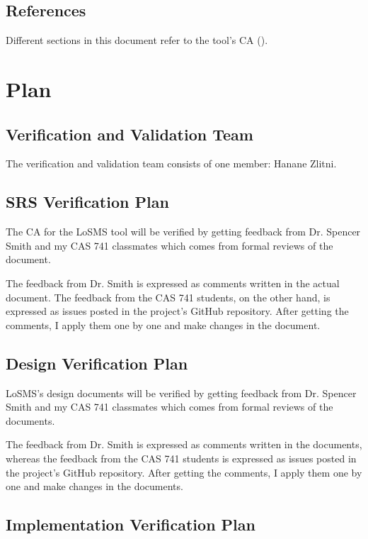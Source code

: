 \documentclass[12pt, titlepage]{article}
\newcommand{\famname}{LoSMS} %
\begin{document}
\subsection{References}

Different sections in this document refer to the tool's CA (\cite{losms-ca}).

\section{Plan} \label{Plan}
	
\subsection{Verification and Validation Team}

The verification and validation team consists of one member: Hanane Zlitni.

\subsection{SRS Verification Plan}

The CA for the \famname{} tool will be verified by getting feedback from Dr. 
Spencer Smith and my CAS 741 classmates which comes from formal reviews of the 
document. 

The feedback from Dr. Smith is expressed as comments written in the actual 
document. The feedback from the CAS 741 students, on the other hand, is 
expressed as issues posted in the project's GitHub repository. After getting 
the comments, I apply them one by one and make changes in the document.

\subsection{Design Verification Plan}

\famname{}'s design documents will be verified by getting feedback from 
Dr. Spencer Smith and my CAS 741 classmates which comes from formal reviews of 
the documents.

The feedback from Dr. Smith is expressed as comments written in the documents, 
whereas the feedback from the CAS 741 students is expressed as issues posted in 
the project's GitHub repository. After getting the comments, I apply them one 
by one and make changes in the documents.

\subsection{Implementation Verification Plan}
\end{document}
